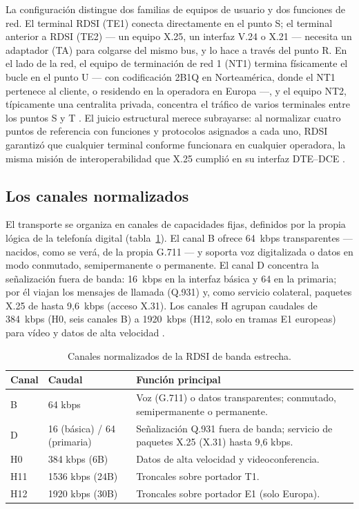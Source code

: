 \documentclass[12pt,a4paper]{article}
\begin{document}
La configuración distingue dos familias de equipos de usuario y dos funciones de red. El terminal RDSI (TE1) conecta directamente en el punto S; el terminal anterior a RDSI (TE2) --- un equipo X.25, un interfaz V.24 o X.21 --- necesita un adaptador (TA) para colgarse del mismo bus, y lo hace a través del punto R. En el lado de la red, el equipo de terminación de red 1 (NT1) termina físicamente el bucle en el punto U --- con codificación 2B1Q en Norteamérica, donde el NT1 pertenece al cliente, o residendo en la operadora en Europa ---, y el equipo NT2, típicamente una centralita privada, concentra el tráfico de varios terminales entre los puntos S y T \cite{itui430, stallings1999}. El juicio estructural merece subrayarse: al normalizar cuatro puntos de referencia con funciones y protocolos asignados a cada uno, RDSI garantizó que cualquier terminal conforme funcionara en cualquier operadora, la misma misión de interoperabilidad que X.25 cumplió en su interfaz DTE--DCE \cite{schwartz1987}.

\subsection{Los canales normalizados}

El transporte se organiza en canales de capacidades fijas, definidos por la propia lógica de la telefonía digital (tabla~\ref{tab:canales}). El canal B ofrece 64~kbps transparentes --- nacidos, como se verá, de la propia G.711 --- y soporta voz digitalizada o datos en modo conmutado, semipermanente o permanente. El canal D concentra la señalización fuera de banda: 16~kbps en la interfaz básica y 64 en la primaria; por él viajan los mensajes de llamada (Q.931) y, como servicio colateral, paquetes X.25 de hasta 9,6~kbps (acceso X.31). Los canales H agrupan caudales de 384~kbps (H0, seis canales B) a 1920~kbps (H12, solo en tramas E1 europeas) para vídeo y datos de alta velocidad \cite{stallings1999}.

\begin{table}[h]
    \centering
    \small
    \begin{tabularx}{\textwidth}{l l X}
        \toprule
        \textbf{Canal} & \textbf{Caudal} & \textbf{Función principal} \\
        \midrule
        B  & 64 kbps                  & Voz (G.711) o datos transparentes; conmutado, semipermanente o permanente. \\
        D  & 16 (básica) / 64 (primaria) & Señalización Q.931 fuera de banda; servicio de paquetes X.25 (X.31) hasta 9,6 kbps. \\
        H0 & 384 kbps (6B)            & Datos de alta velocidad y videoconferencia. \\
        H11 & 1536 kbps (24B)         & Troncales sobre portador T1. \\
        H12 & 1920 kbps (30B)         & Troncales sobre portador E1 (solo Europa). \\
        \bottomrule
    \end{tabularx}
    \caption{Canales normalizados de la RDSI de banda estrecha.}
    \label{tab:canales}
\end{table}
\end{document}
